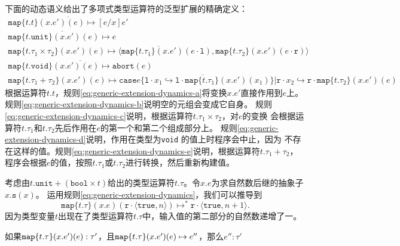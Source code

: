 下面的动态语义给出了多项式类型运算符的泛型扩展的精确定义：
\begin{subequations} \label{eq:generic-extension-dynamics}
	\begin{gather}
	\overline{\texttt{map}\{t.t\}(x.e')(e)\mapsto [e/x]e'} \label{eq:generic-extension-dynamics-a} \\
	\overline{\texttt{map}\{t.\texttt{unit}\}(x.e')(e)\mapsto e} \label{eq:generic-extension-dynamics-b}\\
	\overline{\texttt{map}\{t.\tau_1\times\tau_2\}(x.e')(e)
			  \mapsto
			  \langle\texttt{map}\{t.\tau_1\}(x.e')(e\cdot \texttt{l}),\texttt{map}\{t.\tau_2\}(x.e')(e\cdot \texttt{r})\rangle} \label{eq:generic-extension-dynamics-c}\\
	\overline{\texttt{map}\{t.\texttt{void}\}(x.e')(e)\mapsto\texttt{abort}(e)} \label{eq:generic-extension-dynamics-d}\\
	\overline{\texttt{map}\{t.\tau_1+\tau_2\}(x.e')(e)\mapsto
	          \texttt{case} e\{\texttt{l}\cdot x_1\hookrightarrow\texttt{l}\cdot\texttt{map}\{t.\tau_1\}(x.e')(x_1)\}|
               \texttt{r}\cdot x_2\hookrightarrow\texttt{r}\cdot\texttt{map}\{t.\tau_2\}(x.e')(e)} \label{eq:generic-extension-dynamics-e}
	\end{gather}
\end{subequations}
根据运算符$t.t$，规则\ref{eq:generic-extension-dynamics-a}将变换$x.e'$直接作用到$e$上。
规则\ref{eq:generic-extension-dynamics-b}说明空的元组会变成它自身。
规则\ref{eq:generic-extension-dynamics-c}说明，根据运算符$t.\tau _1\times\tau_2$，对$e$的变换
会根据运算符$t.\tau_1$和$t.\tau_2$先后作用在$e$的第一个和第二个组成部分上。
规则\ref{eq:generic-extension-dynamics-d}说明，作用在类型为\texttt{void} 的值上时程序会中止，因为
不存在这样的值。规则\ref{eq:generic-extension-dynamics-e}说明，根据运算符$t.\tau_1+\tau_2$，
程序会根据$e$的值，按照$t.\tau_1$或$t.\tau_2$进行转换，然后重新构建值。

考虑由$t.\texttt{unit}+(\texttt{bool}\times t)$给出的类型运算符$t.\tau$。令$x.e$为求自然数后继的抽象子$x.\texttt{s}(x)$。
运用规则\ref{eq:generic-extension-dynamics}，我们可以推导到
$$\texttt{map}\{t.\tau\}(x.e)(\texttt{r}\cdot\langle\texttt{true},n\rangle)\mapsto^*
\texttt{r}\cdot\langle\texttt{true},n+1\rangle.$$
因为类型变量$t$出现在了类型运算符$t.\tau$中，输入值的第二部分的自然数递增了一。

\begin{theorem}[保留定理]\label{theorem:generic-extension-preservation}
	如果$\normalfont\texttt{map}\{t.\tau\}(x.e')(e):\tau'$，且$\normalfont\texttt{map}\{t.\tau\}(x.e')(e)\mapsto e''$，那么$e'':\tau'$
\end{theorem}

